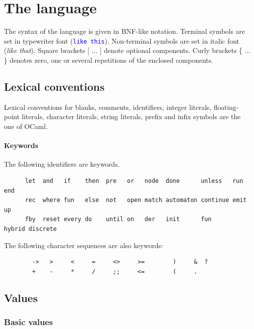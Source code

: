 \documentclass[11pt,titlepage,twoside]{report}
\newcommand{\ocaml}{{\sf OCaml}}
\newcommand{\term}[1]{\textcolor{Blue}{\tt #1}}
\newcommand{\nterm}[1]{\textcolor{BrickRed}{\it #1}}
\newcommand{\term}[1]{{\tt #1}}
\newcommand{\nterm}[1]{{\em #1}}
\begin{document}
\chapter{The language\label{language}} %

The syntax of the language is given in BNF-like notation. Terminal
symbols are set in typewriter font (\term{like this}). Non-terminal symbols
are set in italic font (\nterm{like that}). Square brackets [ ... ] denote
optional components. Curly brackets \{ ... \} denotes zero, one or several
repetitions of the enclosed components.


\section{Lexical conventions\label{lexical}} %

Lexical conventions for blanks, comments, identifiers, integer
literals, floating-point literals, character literals, string
literals, prefix and infix symbols are the one of \ocaml.

\subsubsection{Keywords}
The following identifiers are keywords.

\begin{verbatim}
      let  and   if    then  pre   or   node  done      unless   run    end
      rec  where fun   else  not   open match automaton continue emit   up
      fby  reset every do    until on   der   init      fun      hybrid discrete
\end{verbatim}
The following character sequences are also keywords:

\begin{verbatim}
        ->   >     <     =     <>     >=        )     &  ?
        +    -     *     /     ;;     <=        (     .
\end{verbatim}

\section{Values\label{values}} %
\subsection{Basic values\label{basicvalues}} %
\end{document}
